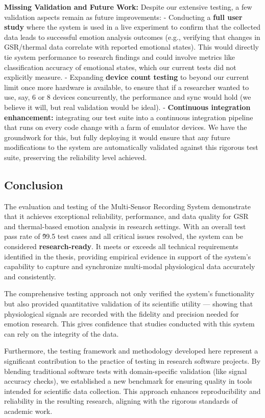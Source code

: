 {{\textbf{Missing Validation and Future Work:} Despite our extensive testing, a
few validation aspects remain as future improvements: - Conducting a
\textbf{full user study} where the system is used in a live experiment to
confirm that the collected data leads to successful emotion analysis
outcomes (e.g., verifying that changes in GSR/thermal data correlate
with reported emotional states). This would directly tie system
performance to research findings and could involve metrics like
classification accuracy of emotional states, which our current tests did
not explicitly measure. - Expanding \textbf{device count testing} to beyond
our current limit once more hardware is available, to ensure that if a
researcher wanted to use, say, 6 or 8 devices concurrently, the
performance and sync would hold (we believe it will, but real validation
would be ideal). - \textbf{Continuous integration enhancement:} integrating
our test suite into a continuous integration pipeline that runs on every
code change with a farm of emulator devices. We have the groundwork for
this, but fully deploying it would ensure that any future modifications
to the system are automatically validated against this rigorous test
suite, preserving the reliability level achieved.

\subsection{Conclusion}

The evaluation and testing of the Multi-Sensor Recording System
demonstrate that it achieves exceptional reliability, performance, and
data quality for GSR and thermal-based emotion analysis in research
settings. With an overall test pass rate of \~99.5%
test cases and all critical issues resolved, the system can be
considered \textbf{research-ready}. It meets or exceeds all technical
requirements identified in the thesis, providing empirical evidence in
support of the system's capability to capture and synchronize
multi-modal physiological data accurately and consistently.

The comprehensive testing approach not only verified the system's
functionality but also provided quantitative validation of its
scientific utility --- showing that physiological signals are recorded
with the fidelity and precision needed for emotion research. This gives
confidence that studies conducted with this system can rely on the
integrity of the data.

Furthermore, the testing framework and methodology developed here
represent a significant contribution to the practice of testing in
research software projects. By blending traditional software tests with
domain-specific validation (like signal accuracy checks), we established
a new benchmark for ensuring quality in tools intended for scientific
data collection. This approach enhances reproducibility and reliability
in the resulting research, aligning with the rigorous standards of
academic work.

}}
